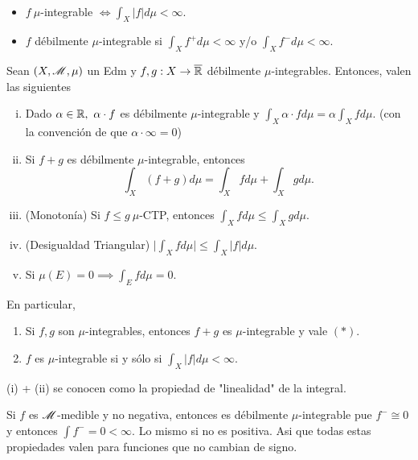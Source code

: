 
\begin{recordar}~
	\begin{itemize}
		\item $f \ \mu$-integrable $\iff \int_{X} |f| d\mu < \infty$.

		\item $f$ débilmente $\mu$-integrable si $\int_{X} f^{+} d\mu < \infty$ y/o $\int_{X} f^{-} d\mu < \infty$.
	\end{itemize}
\end{recordar}

\begin{theorem}
	Sean $(X, \mathscr{M}, \mu)$ un Edm y $f,g : X \to \overline{\mathbb{R}}$ débilmente $\mu$-integrables. Entonces, valen las siguientes
	\begin{enumerate}[i)]
		\item Dado $\alpha \in \mathbb{R},\ \alpha \cdot f$ es débilmente $\mu$-integrable y $\int_{X} \alpha \cdot f d\mu = \alpha \int_{X} f d\mu$. (con la convención de que $\alpha \cdot \infty = 0$)

		\item Si $f + g$ es débilmente $\mu$-integrable, entonces 
		\[ \int_{X} (f + g) d\mu = \int_{X} f d\mu + \int_{X} g d\mu. \tag{$*$} \]

		\item (Monotonía) Si $f \leq g \ \mu$-CTP, entonces $\int_{X} f d\mu \leq \int_{X} g d\mu$.

		\item (Desigualdad Triangular) $\big| \int_{X} f d\mu \big| \leq \int_{X} |f| d\mu$.

		\item Si $\mu(E) = 0 \implies \int_{E} f d\mu = 0$.
	\end{enumerate}
	En particular,
	\begin{enumerate}
		\item Si $f,g$ son $\mu$-integrables, entonces $f + g$ es $\mu$-integrable y vale $(*)$.

		\item $f$ es $\mu$-integrable si y sólo si $\int_{X} |f| d\mu < \infty$.
	\end{enumerate}
\end{theorem}

\begin{note}
	(i) + (ii) se conocen como la propiedad de "linealidad" de la integral.
\end{note}

\begin{remark}
	Si $f$ es $\mathscr{M}$-medible y no negativa, entonces es débilmente $\mu$-integrable pue $f^{-} \cong 0$ y entonces $\int f^{-} = 0 < \infty$. Lo mismo si no es positiva. Asi que todas estas propiedades valen para funciones que no cambian de signo.
\end{remark}

